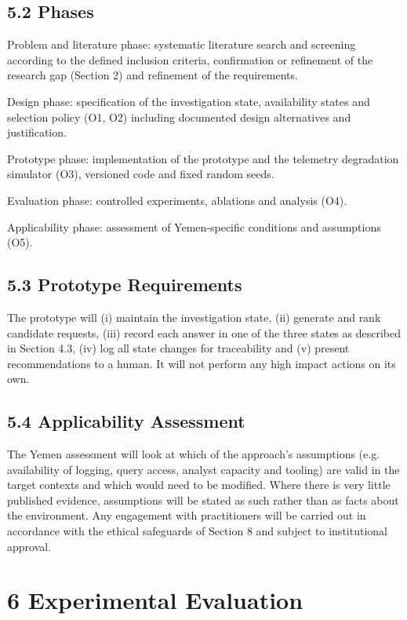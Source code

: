 \documentclass[a4paper,11pt]{article}
\begin{document}
\subsection{5.2 Phases}
Problem and literature phase: systematic literature search and screening according to the defined inclusion criteria, confirmation or refinement of the research gap (Section 2) and refinement of the requirements.\par
Design phase: specification of the investigation state, availability states and selection policy (O1, O2) including documented design alternatives and justification.\par
Prototype phase: implementation of the prototype and the telemetry degradation simulator (O3), versioned code and fixed random seeds.\par
Evaluation phase: controlled experiments, ablations and analysis (O4).\par
Applicability phase: assessment of Yemen-specific conditions and assumptions (O5).\par
\subsection{5.3 Prototype Requirements}
The prototype will (i) maintain the investigation state, (ii) generate and rank candidate requests, (iii) record each answer in one of the three states as described in Section 4.3, (iv) log all state changes for traceability and (v) present recommendations to a human. It will not perform any high impact actions on its own.\par
\subsection{5.4 Applicability Assessment}
The Yemen assessment will look at which of the approach's assumptions (e.g. availability of logging, query access, analyst capacity and tooling) are valid in the target contexts and which would need to be modified. Where there is very little published evidence, assumptions will be stated as such rather than as facts about the environment. Any engagement with practitioners will be carried out in accordance with the ethical safeguards of Section 8 and subject to institutional approval.\par
\section{6 Experimental Evaluation}
\end{document}
